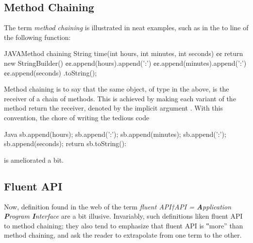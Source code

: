 \subsection{Method Chaining}
The term \emph{method chaining} is illustrated in neat examples, such
as in the  to  line of the following \Java function:
\begin{lCode}{JAVA}{Method chaining}
String time(int hours, int minutes, int seconds) {¢¢
  return new StringBuilder()
    ¢¢.append(hours).append(':')
    ¢¢.append(minutes).append(':')
    ¢¢.append(seconds)
    .toString();
}
\end{lCode}
Method chaining is to say that the same object,  of type  in the above,
   is the receiver of a chain of methods.
This is achieved by making each variant of the method  return the receiver, denoted by the
  implicit argument .
With this convention, the chore of writing the tedious code
\begin{lcode}{Java}
sb.append(hours);
sb.append(':');
sb.append(minutes);
sb.append(':');
sb.append(seconds);
return sb.toString():
\end{lcode}
is ameliorated a bit.

\subsection{Fluent API}
Now, definition found in the web of the term \emph{fluent API†{API =
    \textbf Application \textbf Program \textbf Interface
}} are a bit illusive.
Invariably, such definitions liken fluent API to method chaining;
  they also tend to emphasize that fluent API is ‟more” than method
  chaining, and ask the reader to extrapolate from one term to the other.

